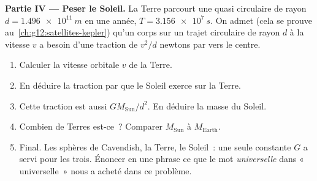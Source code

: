 \begin{problem}
\medskip
\noindent\textbf{Partie IV --- Peser le Soleil.}
La Terre parcourt une  quasi circulaire de rayon
$d = \qty{1.496e11}{m}$ en une année, $T = \qty{3.156e7}{s}$. On
admet (cela se prouve au~\cref{ch:g12:satellites-kepler}) qu'un corps
sur un trajet circulaire de rayon $d$ à la vitesse $v$ a besoin d'une
traction de $v^2/d$ newtons par  vers le centre.
\begin{enumerate}[resume]
  \item Calculer la vitesse orbitale $v$ de la Terre.
  \item En déduire la traction par  que le Soleil
        exerce sur la Terre.
  \item Cette traction est aussi $G M_{\text{Sun}} / d^2$. En déduire
        la masse du Soleil.
  \item Combien de Terres est-ce~? Comparer $M_{\text{Sun}}$ à
        $M_{\text{Earth}}$.
  \item Final. Les sphères de Cavendish, la Terre, le Soleil~: une
        seule constante $G$ a servi pour les trois. Énoncer en une
        phrase ce que le mot \emph{universelle} dans «~
        universelle~» nous a acheté dans ce problème.
\end{enumerate}
\end{problem}
